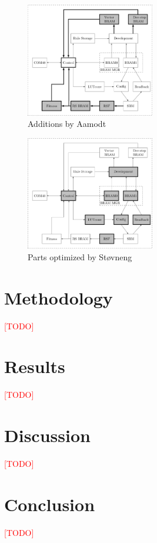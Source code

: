 \documentclass[a4paper]{IEEEtran}
\newcommand\TODO{\textcolor{red}{[TODO]}}
\begin{document}
\begin{figure}[h!]
    \centering
    \includegraphics[width=0.5\textwidth]{figures/ca-aamodt}
    \caption{Additions by Aamodt}
    \label{fig:ca-aamodt}
\end{figure}

\begin{figure}[h!]
    \centering
    \includegraphics[width=0.5\textwidth]{figures/ca-stovneng}
    \caption{Parts optimized by Støvneng}
    \label{fig:ca-stovneng}
\end{figure}

\section{Methodology}

\TODO

\section{Results}

\TODO

\section{Discussion}

\TODO

\section{Conclusion}

\TODO



\nocite{*}
\end{document}
